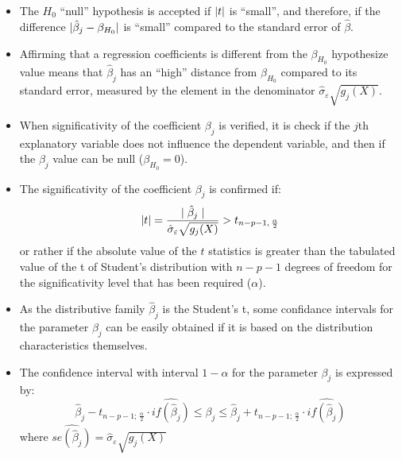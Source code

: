\begin{frame}
  \vspace*{.75cm}
  \begin{itemize}
    \item The $ H_0 $ ``null'' hypothesis is accepted if $ \lvert t\rvert $ is ``small'', and therefore, if the difference $ \lvert\hat{\beta}_j-\beta_{H_0}\rvert $ is ``small'' compared to the standard error of $ \hat{\beta} $.
    \vspace*{.75cm}
    \item Affirming that a regression coefficients is different from the $ \beta_{H_0}  $  hypothesize value means that $ \hat{\beta}_j $ has an ``high'' distance from $ \beta_{H_0} $ compared to its standard error, measured by the element in the denominator $\hat{\sigma}_{\varepsilon}\sqrt{g_j(X)}$.
  \end{itemize}
\end{frame}

\begin{frame}
  \vspace*{.75cm}
  \begin{itemize}   
    \item When significativity of the coefficient $ \beta_j $ is verified, it is check if the $j$th explanatory variable does not influence the dependent variable, and then if the  $ \beta_j $ value can be null ($ \beta_{H_0} = 0 $).
    \vspace*{.75cm}
    \item The significativity of the coefficient $ \beta_j $ is confirmed if:
      $$ \lvert t\rvert = \frac{\mid\hat{\beta}_j\mid }{\hat{\sigma}_{\varepsilon}\sqrt{g_j(X)}} > t_{n-p-1,\,\frac{\alpha}{2}} $$
      or rather if the absolute value of the $ t $ statistics is greater than the tabulated value of the t of Student's distribution with $ n-p-1 $ degrees of freedom for the significativity level that has been required ($ \alpha $).
  \end{itemize}
\end{frame}

\begin{frame}
  \vspace*{.5cm}
  \begin{itemize}
  \item As the distributive family $\hat{\beta}_j$ is the Student's t, some confidance intervals for the parameter  $\beta_j$ can be easily obtained if it is based on the distribution characteristics themselves. 
  \vspace*{.5cm}
  \item The confidence interval with interval $1-\alpha$ for the parameter $\beta_j$ is expressed by:
    $$\hat{\beta}_j-t_{n-p-1;\,\frac{\alpha}{2}}\cdot \widehat{if(\hat{\beta}_j)}\leqslant\beta_j\leqslant\hat{\beta}_j+t_{n-p-1;\,\frac{\alpha}{2}}\cdot \widehat{if(\hat{\beta}_j)}$$
    where $\widehat{se(\hat{\beta}_j)}=\hat{\sigma}_{\varepsilon}\sqrt{g_j(X)}$
\end{itemize}
\end{frame}

